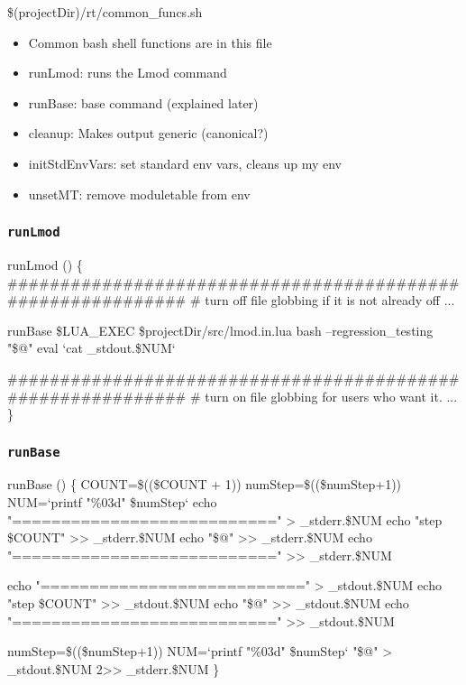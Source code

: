 \documentclass{beamer}
\begin{document}
\begin{frame}{\$(projectDir)/rt/common\_funcs.sh}
  \begin{itemize}
    \item Common bash shell functions are in this file
    \item runLmod: runs the Lmod command 
    \item runBase: base command (explained later)
    \item cleanup: Makes output generic (canonical?)
    \item initStdEnvVars: set standard env vars, cleans up my env
    \item unsetMT: remove moduletable from env
  \end{itemize}
\end{frame}

\begin{frame}[fragile]
  \frametitle{\texttt{runLmod}}
    {\tiny
\begin{semiverbatim}
runLmod ()
\{
   ############################################################
   # turn off file globbing if it is not already off
   ...

   runBase \$LUA\_EXEC \$projectDir/src/lmod.in.lua bash --regression\_testing "\$@"
   eval `cat \_stdout.\$NUM`

   ############################################################
   # turn on file globbing for users who want it.
   ...
\}
\end{semiverbatim}
    }
\end{frame}

\begin{frame}[fragile]
  \frametitle{\texttt{runBase}}
    {\tiny
\begin{semiverbatim}
runBase ()
\{
   COUNT=\$((\$COUNT + 1))
   numStep=\$((\$numStep+1)) 
   NUM=`printf "\%03d" \$numStep`
   echo "===========================" >  \_stderr.\$NUM
   echo "step \$COUNT"                 >> \_stderr.\$NUM
   echo "\$@"                          >> \_stderr.\$NUM
   echo "===========================" >> \_stderr.\$NUM

   echo "===========================" >  \_stdout.\$NUM
   echo "step \$COUNT"                 >> \_stdout.\$NUM
   echo "\$@"                          >> \_stdout.\$NUM
   echo "===========================" >> \_stdout.\$NUM

   numStep=\$((\$numStep+1))
   NUM=`printf "\%03d" \$numStep`
   "\$@" > \_stdout.\$NUM 2>> \_stderr.\$NUM
\}
\end{semiverbatim}
    }
\end{frame}
\end{document}
